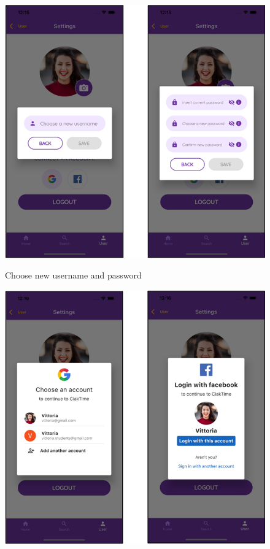 \documentclass[12pt, a4paper]{article}
\numberwithin{figure}{section}
\begin{document}
\begin{center}
	\begin{minipage}[t]{0.46\textwidth}
		\begin{figure}[H]
			\centering
			\includegraphics[width=1\textwidth]{images/final/changeUsernamePass.png}\\
			\caption{Choose new username and password}
		\end{figure}
	\end{minipage}
	\hspace{0.03\linewidth}
	\begin{minipage}[t]{0.46\textwidth}
		\begin{figure}[H]
			\centering
			\includegraphics[width=1\textwidth]{images/final/connectSocial.png}\\

\end{figure}
\end{minipage}
\end{center}
\end{document}
